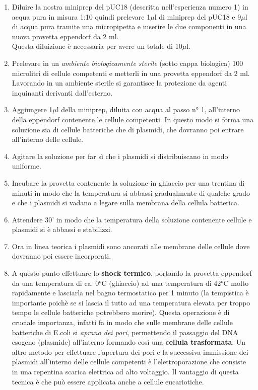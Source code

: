 \begin{enumerate}
	\item Diluire la nostra miniprep del pUC18 (descritta nell'esperienza numero 1)
  in acqua pura in misura 1:10 quindi prelevare 1$\mu$l di miniprep del pUC18 e
  9$\mu$l di acqua pura tramite una micropipetta e inserire le due componenti
  in una nuova provetta eppendorf da 2 ml. \\
  Questa diluizione \`e necessaria per avere un totale di 10$\mu$l.


	\item Prelevare in un \textit{ambiente biologicamente sterile} (sotto cappa biologica) 100 microlitri
  di cellule competenti e metterli in una provetta eppendorf da 2 ml.
  Lavorando in un ambiente sterile si garantisce la protezione da agenti inquinanti derivanti dall’esterno.

	\item Aggiungere 1$\mu$l della miniprep, diluita con acqua al passo n° 1,
  all'interno della eppendorf contenente le cellule competenti.
  In questo modo si forma una soluzione sia di cellule batteriche che di plasmidi,
  che dovranno poi entrare all'interno delle cellule.

	\item Agitare la soluzione per far s\`i che i plasmidi si distribuiscano in
  modo uniforme.
  \item Incubare la provetta contenente la soluzione in ghiaccio per una trentina di minuti
  in modo che la temperatura si abbassi gradualmente di qualche grado e che i plasmidi
  si vadano a legare sulla membrana della cellula batterica.

	\item Attendere 30' in modo che la temperatura della soluzione contenente cellule e plasmidi si è abbassi
  e stabilizzi.
  \item Ora in linea teorica i plasmidi sono ancorati alle membrane delle cellule dove dovranno poi essere
  incorporati.
  \item A questo punto effettuare lo \textbf{shock termico}, portando la provetta eppendorf
  da una temperatura di ca. 0°C (ghiaccio) ad una temperatura di 42°C  molto rapidamente e lasciarla
  nel bagno termostatico per 1 minuto (la tempistica è importante poichè se si lascia il tutto ad una
  temperatura elevata per troppo tempo le cellule batteriche potrebbero morire).
  Questa operazione \`e di cruciale importanza, infatti fa in modo che sulle membrane delle cellule batteriche
  di E.coli si \textit{aprano dei pori}, permettendo il passaggio del DNA esogeno (plasmide) all'interno
  formando così una \textbf{cellula trasformata}.
	Un altro metodo per effettuare l'apertura dei pori e la successiva immissione dei plasmidi all'interno
  delle cellule competenti è l'elettroporazione che consiste in una repentina scarica elettrica
  ad alto voltaggio. Il vantaggio di questa tecnica \`e che può essere applicata anche a cellule eucariotiche.


\end{enumerate}
